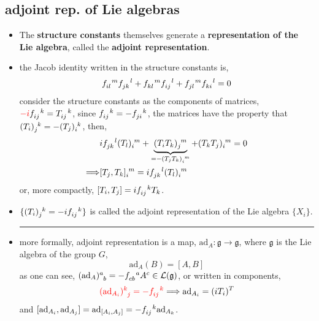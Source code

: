 \subsection{adjoint rep. of Lie algebras}
\begin{itemize}
	\item The \textbf{structure constants} themselves generate a \textbf{representation of the Lie algebra}, called the \textbf{adjoint representation}.
	
	\item the Jacob identity written in the structure constants is,
	\begin{equation}
		\tensor{f}{_{i l}^m} \tensor{f}{_{j k}^l} + \tensor{f}{_{k l}^m} \tensor{f}{_{i j}^l} + \tensor{f}{_{j l}^m} \tensor{f}{_{k i}^l} = 0
	\end{equation}
	consider the structure constants as the components of matrices, $\mathcolor{red}{- i} \tensor{f}{_{i j}^k} = \tensor{T}{_{i j}^k}$, since $\tensor{f}{_{i j}^k} = - \tensor{f}{_{j i}^k}$, the matrices have the property that $\tensor{(T_i)}{_j^k} = - \tensor{(T_j)}{_i^k}$, then,
	\begin{align}
		& i \tensor{f}{_{j k}^l} \tensor{(T_l)}{_i^m} + \underbrace{\tensor{(T_i T_k)}{_j^m}}_{= - \tensor{(T_j T_k)}{_i^m}} + \tensor{(T_k T_j)}{_i^m} = 0 \notag \\
		\Longrightarrow & \tensor{[T_j, T_k]}{_i^m} = i \tensor{f}{_{j k}^l} \tensor{(T_l)}{_i^m}
	\end{align}
	or, more compactly, $[T_i, T_j] = i \tensor{f}{_{i j}^k} T_k$.
	
	\item $\{ \tensor{(T_i)}{_j^k} = - i \tensor{f}{_{i j}^k}\}$ is called the adjoint representation of the Lie algebra $\{X_i\}$.
	
	\noindent\rule[0.5ex]{\linewidth}{0.5pt} %
	
	\item more formally, adjoint representation is a map, $\mathrm{ad}_A : \mathfrak{g} \rightarrow \mathfrak{g}$, where $\mathfrak{g}$ is the Lie algebra of the group $G$,
	\begin{equation}
		\mathrm{ad}_A(B) = [A, B]
	\end{equation}
	as one can see, $\tensor{(\mathrm{ad}_A)}{^a_b} = - \tensor{f}{_{c b}^a} A^c \in \mathcal{L}(\mathfrak{g})$, or written in components,
	\begin{equation}
		\mathcolor{red}{\tensor{(\mathrm{ad}_{A_i})}{^k_j} = - \tensor{f}{_{i j}^k}} \Longrightarrow \mathrm{ad}_{A_i} = (i T_i)^T
	\end{equation}
	and $[\mathrm{ad}_{A_i}, \mathrm{ad}_{A_j}] = \mathrm{ad}_{[A_i, A_j]} = - \tensor{f}{_{i j}^k} \mathrm{ad}_{A_k}$.
	

\end{itemize}

